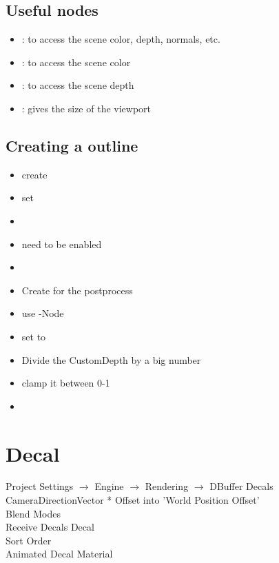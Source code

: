         \subsection{Useful nodes}
            \begin{itemize}
                \item {}: to access the scene color, depth, normals, etc.
                \item {}: to access the scene color
                \item {}: to access the scene depth
                \item {}: gives the size of the viewport
            \end{itemize}


        \subsection{Creating a outline}
            \begin{itemize}
                \item create 
                \item set 
                \item 
                \item {} need  to be enabled
                \item 
                \item Create  for the postprocess
                \item use -Node
                \item set  to 
                \item Divide the CustomDepth by a big number
                \item clamp it between 0-1
                \item 
            \end{itemize}

        

    \section{Decal}
        Project Settings $\rightarrow$ Engine $\rightarrow$ Rendering $\rightarrow$ DBuffer Decals \\
        CameraDirectionVector * Offset into 'World Position Offset' \\
        Blend Modes \\
        Receive Decals Decal \\
        Sort Order \\
        Animated Decal Material \\

